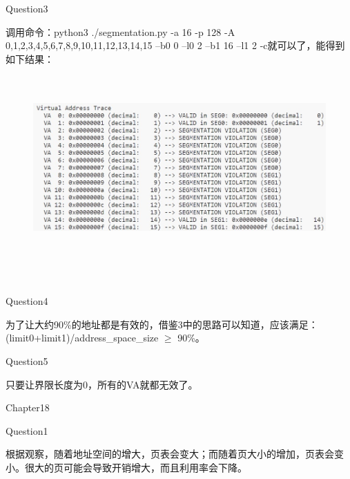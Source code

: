 \documentclass[12pt]{article}
\begin{document}
\begin{large}
	\noindent Question3\\
\end{large}
\hspace*{2em}调用命令：python3 ./segmentation.py -a 16 -p 128 -A 0,1,2,3,4,5,6,7,8,9,10,11,12,13,14,15 --b0 0 --l0 2 --b1 16 --l1 2 -c就可以了，能得到如下结果：
\begin{figure}[h]
    \centering
    \includegraphics[width=13cm,height=7cm]{p2.jpg}
\end{figure}\\

\begin{large}
	\noindent Question4\\
\end{large}
\hspace*{2em}为了让大约90\%的地址都是有效的，借鉴3中的思路可以知道，应该满足：(limit0+limit1)/address\_space\_size $\geq$ 90\%。\\

\begin{large}
	\noindent Question5\\
\end{large}
\hspace*{2em}只要让界限长度为0，所有的VA就都无效了。\\

\begin{LARGE}
    \noindent Chapter18\\
\end{LARGE}
\begin{large}
	\noindent Question1\\
\end{large}
\hspace*{2em}根据观察，随着地址空间的增大，页表会变大；而随着页大小的增加，页表会变小。很大的页可能会导致开销增大，而且利用率会下降。\\
\end{document}
